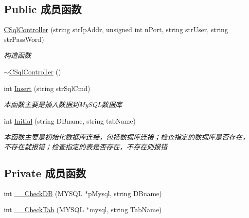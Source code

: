 \subsection*{Public 成员函数}
\begin{DoxyCompactItemize}
\item 
\hyperlink{class_c_sql_controller_af2913bc783bcdd1a27d112d11a033357}{C\+Sql\+Controller} (string str\+Ip\+Addr, unsigned int n\+Port, string str\+User, string str\+Pass\+Word)
\begin{DoxyCompactList}\small\item\em 构造函数 \end{DoxyCompactList}\item 
\hyperlink{class_c_sql_controller_add361c4b54568fcfe57fce584859ee84}{$\sim$\+C\+Sql\+Controller} ()
\item 
int \hyperlink{class_c_sql_controller_ac6c3849769a0952315f847c7f97653e3}{Insert} (string str\+Sql\+Cmd)
\begin{DoxyCompactList}\small\item\em 本函数主要是插入数据到\+My\+S\+Q\+L数据库 \end{DoxyCompactList}\item 
int \hyperlink{class_c_sql_controller_a6b36332a2db91884ebeda56a1e5bc654}{Initial} (string D\+Bname, string tab\+Name)
\begin{DoxyCompactList}\small\item\em 本函数主要是初始化数据库连接，包括数据库连接；检查指定的数据库是否存在，不存在就报错；检查指定的表是否存在，不存在则报错 \end{DoxyCompactList}\end{DoxyCompactItemize}
\subsection*{Private 成员函数}
\begin{DoxyCompactItemize}
\item 
int \hyperlink{class_c_sql_controller_a6a5d2a26bd4ff8c3b04b2d4c21c73d56}{\+\_\+\+\_\+\+Check\+DB} (M\+Y\+S\+QL $\ast$p\+Mysql, string D\+Bname)
\item 
int \hyperlink{class_c_sql_controller_ac686b574fbd9a942df7c96902470d4f1}{\+\_\+\+\_\+\+Check\+Tab} (M\+Y\+S\+QL $\ast$mysql, string Tab\+Name)
\end{DoxyCompactItemize}
